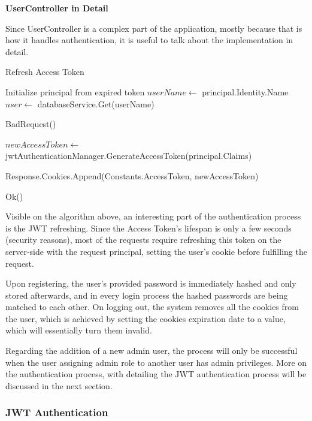 \newpage

\noindent\textbf{UserController in Detail}

Since UserController is a complex part of the application, mostly because that is how it handles authentication, it is useful to talk about the implementation in detail.

\begin{algorithm}
	\caption{Refresh Access Token}
	\begin{algorithmic}
		\State Initialize principal from expired token
		\State $userName \gets$ principal.Identity.Name
		\State $user \gets$ databaseService.Get(userName)
		
		\State \Return BadRequest()
		\EndIf
		
		\State $newAccessToken \gets$ jwtAuthenticationManager.GenerateAccessToken(principal.Claims)

		\State Response.Cookies.Append(Constants.AccessToken, newAccessToken)
		
		\State \Return Ok()
	\end{algorithmic}
\end{algorithm}

Visible on the algorithm above, an interesting part of the authentication process is the JWT refreshing. Since the Access Token's lifespan is only a few seconds (security reasons), most of the requests require refreshing this token on the server-side with the request principal, setting the user's cookie before fulfilling the request.

Upon registering, the user's provided password is immediately hashed and only stored afterwards, and in every login process the hashed passwords are being matched to each other.
On logging out, the system removes all the cookies from the user, which is achieved by setting the cookies expiration date to a value, which will essentially turn them invalid.

Regarding the addition of a new admin user, the process will only be successful when the user assigning admin role to another user has admin privileges. More on the authentication process, with detailing the JWT authentication process will be discussed in the next section.

\subsubsection{JWT Authentication}

